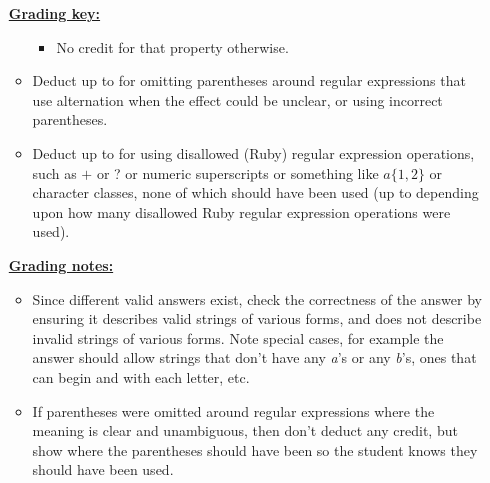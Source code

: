 \documentclass[11pt,fleqn]{article}
\begin{document}
\begin{enumerate}
\begin{info}{\textbf{\underline{Grading key:}}}
\begin{itemize}
\begin{itemize}
                      \item No credit for that property otherwise.

                    \end{itemize}

                    \smallskip

              \item Deduct up to  for omitting parentheses around
                    regular expressions that use alternation when the
                    effect could be unclear, or using incorrect parentheses.

              \item Deduct up to  for using disallowed (Ruby)
                    regular expression operations, such as $+$ or ? or
                    numeric superscripts or something like $a\{1,2\}$ or
                    character classes, none of which should have been used
                    (up to  depending upon how many disallowed Ruby
                    regular expression operations were used).

            \end{itemize}

          \end{info}

          \begin{info}{\textbf{\underline{Grading notes:}}}

            \smallskip

            \begin{itemize}

              \addtolength{\itemsep}{1mm}

              \item Since different valid answers exist, check the
                    correctness of the answer by ensuring it describes valid
                    strings of various forms, and does not describe invalid
                    strings of various forms.  Note special cases, for
                    example the answer should allow strings that don't have
                    any \emph{a}'s or any \emph{b}'s, ones that can begin
                    and with each letter, etc.

              \item If parentheses were omitted around regular expressions
                    where the meaning is clear and unambiguous, then don't
                    deduct any credit, but show where the parentheses should
                    have been so the student knows they should have been
                    used.


\end{itemize}
\end{info}
\end{enumerate}
\end{document}
